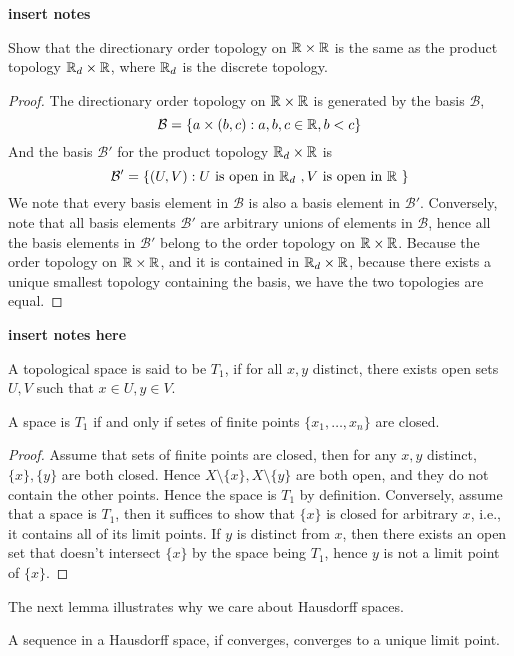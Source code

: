 \textbf{insert notes}
\begin{prob}
    Show that the directionary order topology on $\mathbb{R}\times\mathbb{R}$ is the same as the product topology $\mathbb{R}_d\times\mathbb{R}$, where $\mathbb{R}_d$ is the discrete topology. 
\end{prob}
\begin{proof}
    The directionary order topology on $\mathbb{R}\times\mathbb{R}$ is generated by the basis $\mathcal{B}$, 
    \begin{equation*}
        \mathcal{B}=\{a\times (b,c): a,b,c\in\mathbb{R}, b<c\}
    \end{equation*}
    And the basis $\mathcal{B}'$ for the product topology $\mathbb{R}_d\times\mathbb{R}$ is
    \begin{equation*}
        \mathcal{B}'=\{(U,V): U \text{ is open in $\mathbb{R}_d$ }, V\text{ is open in $\mathbb{R}$ }\}
    \end{equation*}
    We note that every basis element in $\mathcal{B}$ is also a basis element in $\mathcal{B}'$. Conversely, note that all basis elements $\mathcal{B}'$ are arbitrary unions of elements in $\mathcal{B}$, hence all the basis elements in $\mathcal{B}'$ belong to the  order topology on $\mathbb{R}\times\mathbb{R}$. Because the order topology on $\mathbb{R}\times\mathbb{R}$, and it is contained in $\mathbb{R}_d\times\mathbb{R}$, because there exists a unique smallest topology containing the basis, we have the two topologies are equal.
\end{proof}




\textbf{insert notes here}
\begin{defn}[$T_1$ space]
    A topological space is said to be $T_1$, if for all $x,y$ distinct, there exists open sets $U, V$ such that $x\in U, y\in V$. 
\end{defn}
\begin{lem}
    A space is $T_1$ if and only if setes of finite points $\{x_1, \ldots, x_n\}$ are closed.
\end{lem}
\begin{proof}
    Assume that sets of finite points are closed, then for any $x, y$ distinct, $\{x\}, \{y\}$ are both closed. Hence $X\setminus\{x\}, X\setminus\{y\}$ are both open, and they do not contain the other points. Hence the space is $T_1$ by definition.
    Conversely, assume that a space is $T_1$, then it suffices to show that $\{x\}$ is closed for arbitrary $x$, i.e., it contains all of its limit points. If $y$ is distinct from $x$, then there exists an open set that doesn't intersect $\{x\}$ by the space being $T_1$, hence $y$ is not a limit point of $\{x\}$.
\end{proof}
The next lemma illustrates why we care about Hausdorff spaces.
\begin{lem}
    A sequence in a Hausdorff space, if converges, converges to a unique limit point.
\end{lem}



